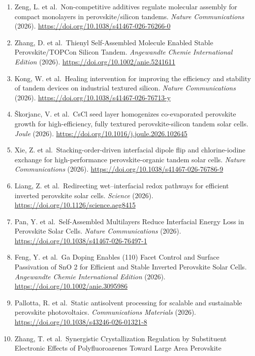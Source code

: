 \documentclass[
  11pt,
]{article}
\providecommand{\tightlist}{%
  \setlength{\itemsep}{0pt}\setlength{\parskip}{0pt}}
\begin{document}
\begin{enumerate}
\def\labelenumi{\arabic{enumi}.}
\tightlist
\item
  Zeng, L. et al.~Non-competitive additives regulate molecular assembly
  for compact monolayers in perovskite/silicon tandems. \emph{Nature
  Communications} (2026).
  \url{https://doi.org/10.1038/s41467-026-76266-0}
\item
  Zhang, D. et al.~Thienyl Self‐Assembled Molecule Enabled Stable
  Perovskite/TOPCon Silicon Tandem. \emph{Angewandte Chemie
  International Edition} (2026).
  \url{https://doi.org/10.1002/anie.5241611}
\item
  Kong, W. et al.~Healing intervention for improving the efficiency and
  stability of tandem devices on industrial textured silicon.
  \emph{Nature Communications} (2026).
  \url{https://doi.org/10.1038/s41467-026-76713-y}
\item
  Škorjanc, V. et al.~CsCl seed layer homogenizes co-evaporated
  perovskite growth for high-efficiency, fully textured
  perovskite-silicon tandem solar cells. \emph{Joule} (2026).
  \url{https://doi.org/10.1016/j.joule.2026.102645}
\item
  Xie, Z. et al.~Stacking-order-driven interfacial dipole flip and
  chlorine-iodine exchange for high-performance perovskite-organic
  tandem solar cells. \emph{Nature Communications} (2026).
  \url{https://doi.org/10.1038/s41467-026-76786-9}
\item
  Liang, Z. et al.~Redirecting wet--interfacial redox pathways for
  efficient inverted perovskite solar cells. \emph{Science} (2026).
  \url{https://doi.org/10.1126/science.aeg8415}
\item
  Pan, Y. et al.~Self-Assembled Multilayers Reduce Interfacial Energy
  Loss in Perovskite Solar Cells. \emph{Nature Communications} (2026).
  \url{https://doi.org/10.1038/s41467-026-76497-1}
\item
  Feng, Y. et al.~Ga Doping Enables (110) Facet Control and Surface
  Passivation of SnO 2 for Efficient and Stable Inverted Perovskite
  Solar Cells. \emph{Angewandte Chemie International Edition} (2026).
  \url{https://doi.org/10.1002/anie.3095986}
\item
  Pallotta, R. et al.~Static antisolvent processing for scalable and
  sustainable perovskite photovoltaics. \emph{Communications Materials}
  (2026). \url{https://doi.org/10.1038/s43246-026-01321-8}
\item
  Zhang, T. et al.~Synergistic Crystallization Regulation by Substituent
  Electronic Effects of Polyfluoroarenes Toward Large Area Perovskite

\end{enumerate}
\end{document}
